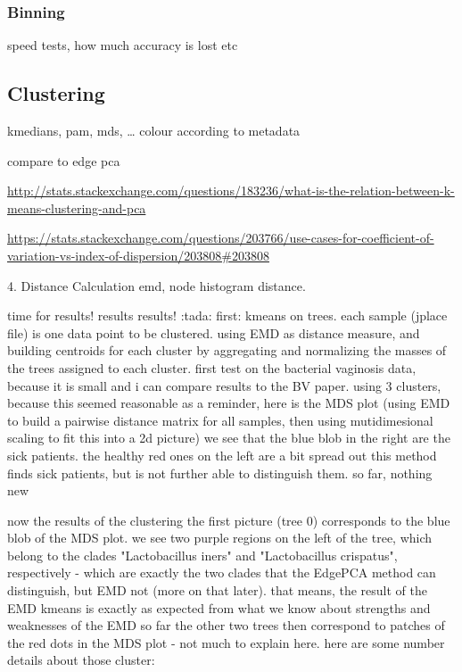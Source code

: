 \subsubsection{Binning}
\label{sec:Evaluation:sub:DistanceMeasures:sub:Binning}

speed tests, how much accuracy is lost etc


\subsection{Clustering}
\label{sec:Postprocessing:sub:Clustering}

kmedians, pam, mds, … colour according to metadata

compare to edge pca

\url{http://stats.stackexchange.com/questions/183236/what-is-the-relation-between-k-means-clustering-and-pca}

\url{https://stats.stackexchange.com/questions/203766/use-cases-for-coefficient-of-variation-vs-index-of-dispersion/203808#203808}

4. Distance Calculation
emd, node histogram distance.


time for results! results results! :tada:
first: kmeans on trees. each sample (jplace file) is one data point to be clustered. using EMD as distance measure, and building centroids for each cluster by aggregating and normalizing the masses of the trees assigned to each cluster.
first test on the bacterial vaginosis data, because it is small and i can compare results to the BV paper.
using 3 clusters, because this seemed reasonable
as a reminder, here is the MDS plot (using EMD to build a pairwise distance matrix for all samples, then using mutidimesional scaling to fit this into a 2d picture)
we see that the blue blob in the right are the sick patients. the healthy red ones on the left are a bit spread out
this method finds sick patients, but is not further able to distinguish them. so far, nothing new

now the results of the clustering
the first picture (tree 0) corresponds to the blue blob of the MDS plot. we see two purple regions on the left of the tree, which belong to the clades "Lactobacillus iners" and "Lactobacillus crispatus", respectively - which are exactly the two clades that the EdgePCA method can distinguish, but EMD not (more on that later).
that means, the result of the EMD kmeans is exactly as expected from what we know about strengths and weaknesses of the EMD so far
the other two trees then correspond to patches of the red dots in the MDS plot - not much to explain here.
here are some number details about those cluster:

